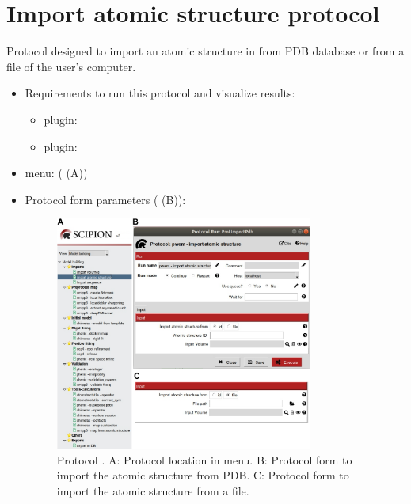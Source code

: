 \section{Import atomic structure protocol}
\label{app:importAtomicStructure}%
Protocol designed to import an atomic structure in \scipion from PDB database or from a file of the user's computer.
   
 \begin{itemize}
  \item Requirements to run this protocol and visualize results:
    \begin{itemize}
        \item \scipion plugin: 
        \item \scipion plugin: 
    \end{itemize}
  \item \scipion menu:
   ( (A))
  
  \item Protocol form parameters ( (B)):
  
  \begin{figure}[H]
    \centering 
    \captionsetup{width=.9\linewidth} 
    \includegraphics[width=0.80\textwidth]{Images_appendix/Fig110.pdf}
    \caption{Protocol . A: Protocol location in \scipion menu. B: Protocol form to import the atomic structure from PDB. C: Protocol form to import the atomic structure from a file.}
    \label{fig:app_protocol_atomicStructure_1}
   \end{figure}


\end{itemize}
